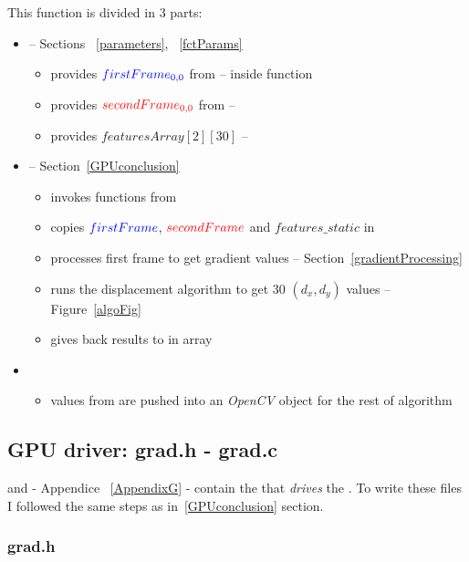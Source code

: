 This function is divided in 3 parts:
\begin{itemize}
	\item {} -- Sections ~\ref{parameters}, ~\ref{fctParams}
		\begin{itemize}
			\item provides $\textcolor{blue}{firstFrame_{0,0}}$ from  --  inside function
			\item provides $\textcolor{red}{secondFrame_{0,0}}$  from  -- 
			\item provides  $featuresArray[2][30]$ -- 
		\end{itemize}
	\item {} -- Section~\ref{GPUconclusion}
		\begin{itemize}
			\item invokes functions from 
			\item copies $\textcolor{blue}{firstFrame}$, $\textcolor{red}{secondFrame}$ and $features\_static$ in \ram
			\item processes first frame to get gradient values -- Section~\ref{gradientProcessing}
			\item runs the displacement algorithm to get 30 $(d_{x}, d_{y})$ values -- Figure~\ref{algoFig}
			\item gives back results to \cpu{} in  array
		\end{itemize}
	\item {}
		\begin{itemize}
			\item values from  are pushed into an \emph{OpenCV} object for the rest of  algorithm
		\end{itemize}
\end{itemize}

\subsection{GPU driver: grad.h - grad.c}

 and  - Appendice ~\ref{AppendixG} - contain the  that \emph{drives} the \vc. To write these files I followed the same steps as in~\ref{GPUconclusion} section.


\subsubsection{grad.h}

